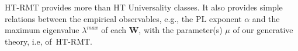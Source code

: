HT-RMT provides more than HT Universality classes.
It also provides simple relations between the empirical observables, e.g., the PL exponent $\alpha$ and the maximum eigenvalue $\lambda^{max}$ of each $\mathbf{W}$, with the parameter(s) $\mu$ of our generative theory, i.e, of~HT-RMT.   


